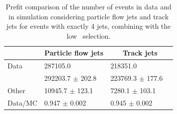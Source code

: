 \documentclass[letterpaper,12pt]{article}
\begin{document}
\begin{table}[!b]
	\centering
	\small
	\setlength\tabcolsep{5pt} 
	\begin{tabular}{|l | ll | ll |}
	\hline
	& \multicolumn{2}{c|}{Particle flow jets} & \multicolumn{2}{c|}{Track jets} \\
	\hline
	Data          &    287105.0                  &        &   218351.0                  &     \\  
	\ttbar\         &    292203.7 $\pm$       202.8 &        &   223769.3 $\pm$       177.6 &   \\
	Other         &     10945.7 $\pm$       123.1 &        &     7280.1 $\pm$       103.1 &   \\
	Data/MC       &     0.947   $\pm$       0.002 &        &    0.945   $\pm$        0.002  &           \\
	\hline
	\end{tabular}
	\vspace{0.2cm}
	\caption{Prefit comparison of the  number of events in data and in 
	simulation considering particle flow jets and track jets for 
	events with exactly 4 jets, combining with the low \pt\ selection.}
	\label{tab:yields_standard}
	\end{table}
\end{document}

